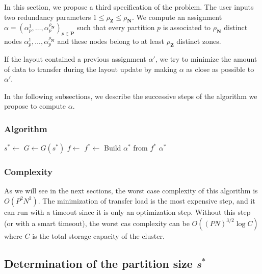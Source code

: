 \documentclass[]{article}
\begin{document}
In this section, we propose a third specification of the problem. The user inputs two redundancy parameters $1\le \rho_\mathbf{Z} \le \rho_\mathbf{N}$. We compute an assignment $\alpha = (\alpha_p^1, \ldots, \alpha_p^{\rho_\mathbf{N}})_{p\in \mathbf{P}}$ such that every partition $p$ is associated to $\rho_\mathbf{N}$ distinct nodes $\alpha_p^1, \ldots, \alpha_p^{\rho_\mathbf{N}}$ and these nodes belong to at least $\rho_\mathbf{Z}$ distinct zones.

If the layout contained a previous assignment $\alpha'$, we try to minimize the amount of data to transfer during the layout update by making $\alpha$ as close as possible to $\alpha'$.

In the following subsections, we describe the successive steps of the algorithm we propose to compute $\alpha$.

\subsubsection*{Algorithm}

\begin{algorithmic}[1]
	\State $s^* \leftarrow$ 
	\State $G \leftarrow G(s^*)$
	\State $f \leftarrow$ 	
	\State $f^* \leftarrow$ 	
	\State Build $\alpha^*$ from $f^*$
	\State \Return $\alpha^*$
	\EndFunction
\end{algorithmic}

\subsubsection*{Complexity}
As we will see in the next sections, the worst case complexity of this algorithm is $O(P^2 N^2)$. The minimization of transfer load is the most expensive step, and it can run with a timeout since it is only an optimization step. Without this step (or with a smart timeout), the worst cas complexity can be $O((PN)^{3/2}\log C)$ where $C$ is the total storage capacity of the cluster. 

\subsection{Determination of the partition size $s^*$}
\end{document}
